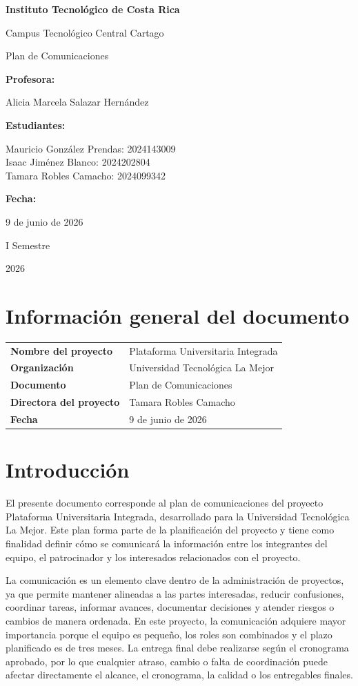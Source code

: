 \documentclass[11pt,spanish]{article}
\title{\DocumentoTitulo}
\author{\EstudiantesPortada}
\date{\FechaDocumento}
\newcommand{\Institucion}{Instituto Tecnológico de Costa Rica}
\newcommand{\Campus}{Campus Tecnológico Central Cartago}
\newcommand{\DocumentoTitulo}{Plan de Comunicaciones}
\newcommand{\Profesor}{Alicia Marcela Salazar Hernández}
\newcommand{\FechaDocumento}{9 de junio de 2026}
\newcommand{\PeriodoAcademico}{I Semestre}
\newcommand{\AnioDocumento}{2026}
\newcommand{\EstudiantesPortada}{%
    Mauricio González Prendas: 2024143009\\
    Isaac Jiménez Blanco: 2024202804\\
    Tamara Robles Camacho: 2024099342%
}
\newcommand{\MakeCover}{%
\begin{titlepage}
\thispagestyle{empty}
\centering

{\bfseries \huge \Institucion \par}
\vspace{0.25cm}
{\LARGE \Campus \par}

\vfill

{\huge \DocumentoTitulo \par}


\vfill

{\bfseries \LARGE Profesora: \par}
{\Large \Profesor \par}

\vfill

{\bfseries \LARGE Estudiantes: \par}
{\Large \EstudiantesPortada \par}

\vfill

{\bfseries\LARGE Fecha: \par}
{\Large \FechaDocumento \par}

\vfill

{\LARGE \PeriodoAcademico \par}
{\LARGE \AnioDocumento \par}

\end{titlepage}%
}
\begin{document}
\hypersetup{pageanchor=false}

\MakeCover

\pagestyle{empty}
\tableofcontents
\clearpage
{}
\hypersetup{pageanchor=true}
\pagestyle{fancy}

\section{Información general del documento}

\begin{table}[H]
\centering
\begin{tabularx}{\textwidth}{p{5cm} Y}
\toprule
\textbf{Nombre del proyecto} & Plataforma Universitaria Integrada \\
\textbf{Organización} & Universidad Tecnológica La Mejor \\
\textbf{Documento} & \DocumentoTitulo \\
\textbf{Directora del proyecto} & Tamara Robles Camacho \\
\textbf{Fecha} & \FechaDocumento \\
\bottomrule
\end{tabularx}
\end{table}

\section{Introducción}

El presente documento corresponde al plan de comunicaciones del proyecto Plataforma Universitaria Integrada, desarrollado para la Universidad Tecnológica La Mejor. Este plan forma parte de la planificación del proyecto y tiene como finalidad definir cómo se comunicará la información entre los integrantes del equipo, el patrocinador y los interesados relacionados con el proyecto.

La comunicación es un elemento clave dentro de la administración de proyectos, ya que permite mantener alineadas a las partes interesadas, reducir confusiones, coordinar tareas, informar avances, documentar decisiones y atender riesgos o cambios de manera ordenada. En este proyecto, la comunicación adquiere mayor importancia porque el equipo es pequeño, los roles son combinados y el plazo planificado es de tres meses. La entrega final debe realizarse según el cronograma aprobado, por lo que cualquier atraso, cambio o falta de coordinación puede afectar directamente el alcance, el cronograma, la calidad o los entregables finales.
\end{document}
